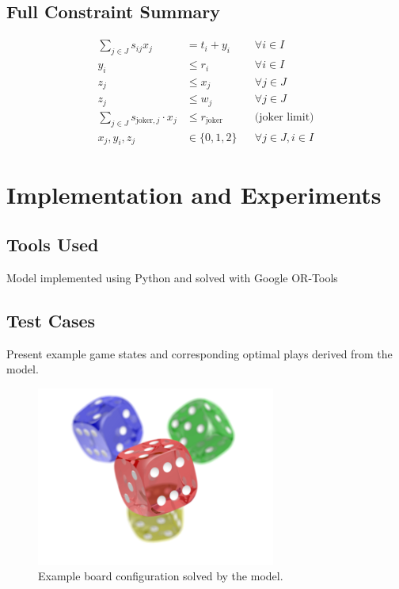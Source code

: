 \documentclass[12pt]{article}
\begin{document}
\subsection{Full Constraint Summary}
\begin{align*}
\sum_{j \in J} s_{ij} x_j &= t_i + y_i &&\forall i \in I \\
y_i &\leq r_i &&\forall i \in I \\
z_j &\leq x_j &&\forall j \in J \\
z_j &\leq w_j &&\forall j \in J \\
\sum_{j \in J} s_{\text{joker}, j} \cdot x_j &\leq r_{\text{joker}} &&\text{(joker limit)} \\
x_j, y_i, z_j &\in \{0, 1, 2\} &&\forall j \in J, i \in I
\end{align*}


\section{Implementation and Experiments}
\subsection{Tools Used}
Model implemented using Python and solved with Google OR-Tools

\subsection{Test Cases}
Present example game states and corresponding optimal plays derived from the model.

\begin{figure}[h]
    \centering
    \includegraphics[width=0.7\textwidth]{Figures/example_image.png}
    \caption{Example board configuration solved by the model.}
\end{figure}
\end{document}
